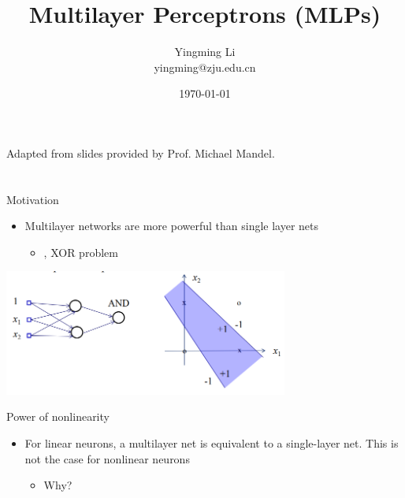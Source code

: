 \documentclass[notes]{beamer}
\title[Opt for ML]{Multilayer Perceptrons (MLPs)}
\author[YingmingLi]{Yingming Li \\ yingming@zju.edu.cn}
\institute[DSERC, ZJU]{Data Science \& Engineering Research Center, ZJU}
\date[\today]{\today}
\providecommand{\tightlist}{%
  \setlength{\itemsep}{0pt}\setlength{\parskip}{0pt}}
\begin{document}

\begin{frame}
	\titlepage
	\begin{center}
		Adapted from slides provided by Prof.  Michael Mandel.		
	\end{center}
\end{frame}
\section{}\label{section}

\begin{frame}{Motivation}

\begin{itemize}
\tightlist
\item
  Multilayer networks are more powerful than single layer nets

  \begin{itemize}
  \tightlist
  \item
    \eg, XOR problem
  \end{itemize}
\end{itemize}

\centering 

\includegraphics[width=0.70000\textwidth]{2018-03-10-11-05-54.png}\\

\end{frame}

\begin{frame}{Power of nonlinearity}

\begin{itemize}
\tightlist
\item
  For linear neurons, a multilayer net is equivalent to a single-layer
  net. This is not the case for nonlinear neurons

  \begin{itemize}
  \tightlist
  \item
    Why?
  \end{itemize}
\end{itemize}

\end{frame}
\end{document}
